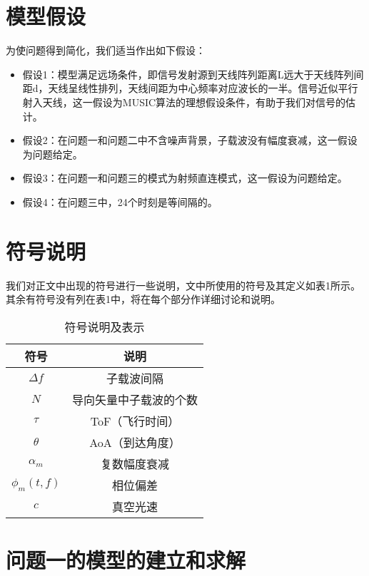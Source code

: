 \documentclass[withoutpreface,bwprint]{cumcmthesis}
\begin{document}

\section{模型假设}
为使问题得到简化，我们适当作出如下假设：

\begin{itemize}[itemindent=2em]
\item 假设1：模型满足远场条件，即信号发射源到天线阵列距离L远大于天线阵列间距d，天线呈线性排列，天线间距为中心频率对应波长的一半。信号近似平行射入天线，这一假设为MUSIC算法的理想假设条件，有助于我们对信号的估计。
\item 假设2：在问题一和问题二中不含噪声背景，子载波没有幅度衰减，这一假设为问题给定。
\item 假设3：在问题一和问题三的模式为射频直连模式，这一假设为问题给定。
\item 假设4：在问题三中，24个时刻是等间隔的。
\end{itemize}

\section{符号说明}
我们对正文中出现的符号进行一些说明，文中所使用的符号及其定义如表1所示。其余有符号没有列在表1中，将在每个部分作详细讨论和说明。

\begin{table}[h]
\begin{center}
\caption{符号说明及表示}
\vspace{0mm}
\begin{tabular}{cc}
\toprule[2pt]
\textbf{\large{符号}} & \textbf{\large{说明}} \\ 
\midrule
$\Delta f$ & 子载波间隔\\
$N$ & 导向矢量中子载波的个数\\
$\tau$ & ToF（飞行时间）\\
$\theta$ & AoA（到达角度）\\
$\alpha_{m}$ & 复数幅度衰减\\
$\phi_{m}(t,f)$ & 相位偏差\\
$c$ & 真空光速\\
\hline
\end{tabular}
\end{center}
\end{table}
\section{问题一的模型的建立和求解}
\end{document}
